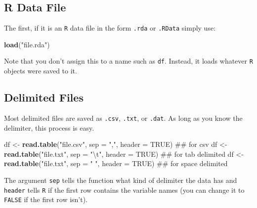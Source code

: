 \documentclass[]{tufte-book}
\newenvironment{Shaded}{}{}
\newcommand{\KeywordTok}[1]{\textcolor[rgb]{0.00,0.44,0.13}{\textbf{#1}}}
\newcommand{\DataTypeTok}[1]{\textcolor[rgb]{0.56,0.13,0.00}{#1}}
\newcommand{\CharTok}[1]{\textcolor[rgb]{0.25,0.44,0.63}{#1}}
\newcommand{\StringTok}[1]{\textcolor[rgb]{0.25,0.44,0.63}{#1}}
\newcommand{\OtherTok}[1]{\textcolor[rgb]{0.00,0.44,0.13}{#1}}
\newcommand{\NormalTok}[1]{#1}
\theoremstyle{definition}
\theoremstyle{definition}
\theoremstyle{remark}
\begin{document}
\subsection*{R Data File}\label{r-data-file}

The first, if it is an \texttt{R} data file in the form \texttt{.rda} or
\texttt{.RData} simply use:

\begin{Shaded}
\begin{Highlighting}[]
\KeywordTok{load}\NormalTok{(}\StringTok{"file.rda"}\NormalTok{)}
\end{Highlighting}
\end{Shaded}

Note that you don't assign this to a name such as \texttt{df}. Instead,
it loads whatever \texttt{R} objects were saved to it.

\subsection*{Delimited Files}\label{delimited-files}

Most delimited files are saved as \texttt{.csv}, \texttt{.txt}, or
\texttt{.dat}. As long as you know the delimiter, this process is easy.

\begin{Shaded}
\begin{Highlighting}[]
\NormalTok{df <-}\StringTok{ }\KeywordTok{read.table}\NormalTok{(}\StringTok{"file.csv"}\NormalTok{, }\DataTypeTok{sep =} \StringTok{","}\NormalTok{, }\DataTypeTok{header =} \OtherTok{TRUE}\NormalTok{)  ## for csv}
\NormalTok{df <-}\StringTok{ }\KeywordTok{read.table}\NormalTok{(}\StringTok{"file.txt"}\NormalTok{, }\DataTypeTok{sep =} \StringTok{"}\CharTok{\textbackslash{}t}\StringTok{"}\NormalTok{, }\DataTypeTok{header =} \OtherTok{TRUE}\NormalTok{)  ## for tab delimited}
\NormalTok{df <-}\StringTok{ }\KeywordTok{read.table}\NormalTok{(}\StringTok{"file.txt"}\NormalTok{, }\DataTypeTok{sep =} \StringTok{" "}\NormalTok{, }\DataTypeTok{header =} \OtherTok{TRUE}\NormalTok{)  ## for space delimited}
\end{Highlighting}
\end{Shaded}

The argument \texttt{sep} tells the function what kind of delimiter the
data has and \texttt{header} tells \texttt{R} if the first row contains
the variable names (you can change it to \texttt{FALSE} if the first row
isn't).
\end{document}
